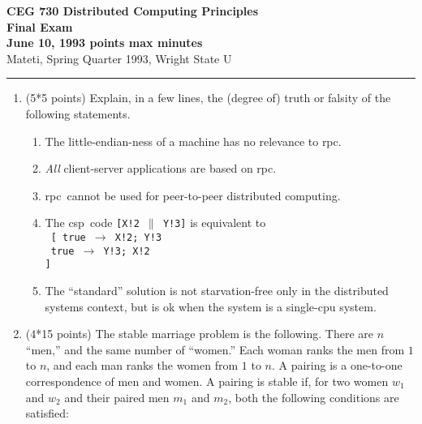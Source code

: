 \def\fat{\framebox[1mm]{\rule{0mm}{2mm}}}
\def\CSP{{\sc csp}}
\def\RPC{{\sc rpc}}
\def\SR{{\sc sr}}
\def\co{{\bf co}}
\def\oc{{\bf oc}}
\def\pa{{$\parallel$}}
\def\lb{\langle}
\def\rb{\rangle}
\def\ra{$\rightarrow$}
\def\await{{\bf await}}
\textheight=8.1in
\parindent=0pt



{\bf CEG 
\large \bf 730 Distributed Computing Principles\\[5pt]
\large Final Exam\\[10pt]
June 10, 1993  points max  minutes\\
}
\bigskip
{Mateti,  Spring Quarter 1993, Wright State U}\\[-5pt]
\hrule

\begin{enumerate}

\item (5*5 points)
Explain, in a few lines, the (degree of) truth or falsity of the
following statements.

\begin{enumerate}
\item
The little-endian-ness of a machine has no relevance to \RPC.

\item
{\sl All} client-server applications are based on \RPC.


\item
\RPC\ cannot be used for peer-to-peer distributed computing.


\item
The \CSP\ code {\tt [X!2 \pa\ Y!3]} is equivalent to \\
{\tt
[  true \ra\ X!2; Y!3\\
\fat\ true \ra\ Y!3; X!2\\
]}

\item
The ``standard'' solution  \noindent is not
starvation-free only in the distributed systems context, but is
ok when the system is a single-cpu system.


\end{enumerate}

\item (4*15 points)
The stable marriage problem is the following.  There are $n$ ``men,''
and the same number of ``women.''  Each woman ranks the men from $1$ to
$n$, and each man ranks the women from $1$ to $n$.  A pairing is a
one-to-one correspondence of men and women.  A pairing is stable if,
for two women $w_1$ and $w_2$ and their paired men $m_1$ and $m_2$,
both the following conditions are satisfied:


\end{enumerate}
